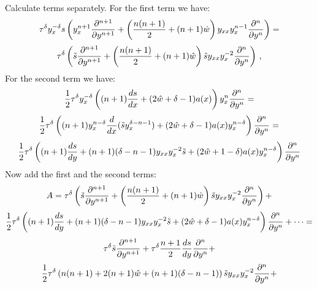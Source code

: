 Calculate
terms separately. For the first term we have:
                    $$
 \tau^\delta y_x^{-\delta}
                           s
                          \left(
                          y_x^{n+1}{\partial ^{n+1}\over \partial y^{n+1}}+
                          \left({n(n+1)\over 2}+(n+1)\hat w\right)y_{xx}y^{n-1}_x
                          {\partial ^{n}\over \partial y^{n}}
                          \right)=
                           $$
                           $$
                 \tau^\delta
                          \left(
                          \tilde s{\partial ^{n+1}\over \partial y^{n+1}}+
                          \left({n(n+1)\over 2}+(n+1)\hat w\right)\tilde sy_{xx}y^{-2}_x
                          {\partial ^{n}\over \partial y^{n}}
                          \right)\,,
                             $$
For the second term we have:
                  $$
              {1\over 2}
        \tau^\delta y_x^{-\delta}
        \left(
        (n+1){ds\over dx}+
        (2\hat w+\delta-1)a(x)
               \right)
               y^n_x {\partial^n\over \partial y^n}=
                       $$
                       $$
                       {1\over 2}
        \tau^\delta
        \left(
        (n+1)y_x^{n-\delta}{d\over dx}(\tilde s y_x^{\delta-n-1})+
        (2\hat w+\delta-1)a(x)y_x^{n-\delta}
               \right)
         {\partial^n\over \partial y^n}=
                       $$
                       $$
                       {1\over 2}
        \tau^\delta
        \left(
        (n+1){ds\over dy}+
        (n+1)(\delta-n-1)y_{xx}y_x^{-2}\tilde s+
        (2\hat w+1-\delta)a(x)y_x^{n-\delta}
               \right)
         {\partial^n\over \partial y^n}
                       $$
Now add the first and the second terms:
              $$
    A=                 \tau^\delta
                          \left(
                          \tilde s{\partial ^{n+1}\over \partial y^{n+1}}+
                          \left({n(n+1)\over 2}+(n+1)\hat w\right)\tilde sy_{xx}y^{-2}_x
                          {\partial ^{n}\over \partial y^{n}}
                          \right)+
                        $$
                         $$
                                                {1\over 2}
        \tau^\delta
        \left(
        (n+1){ds\over dy}+
        (n+1)(\delta-n-1)y_{xx}y_x^{-2}\tilde s+
        (2\hat w+\delta-1)a(x)y_x^{n-\delta}
               \right)
         {\partial^n\over \partial y^n}
                 +\dots=
                         $$
                         $$
                         \tau^\delta
                          \tilde s{\partial ^{n+1}\over \partial y^{n+1}}+
        \tau^\delta {n+1\over 2}{ds\over dy}{\partial^n\over \partial y^n}+
                         $$
                         $$
                         {1\over 2}\tau^\delta
                          \left(
                          n(n+1)+2(n+1)\hat w
                          +(n+1)(\delta-n-1)\right)
                          \tilde sy_{xx}y^{-2}_x{\partial ^{n}\over \partial y^{n}}+
                         $$
